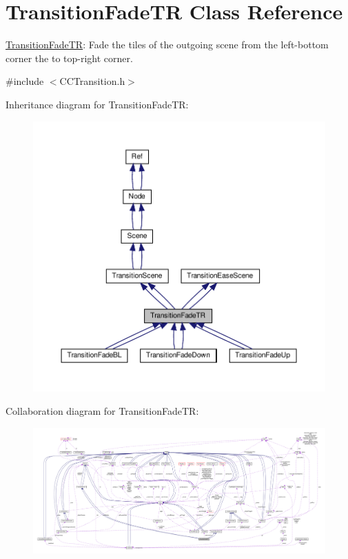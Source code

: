 \hypertarget{classTransitionFadeTR}{}\section{Transition\+Fade\+TR Class Reference}
\label{classTransitionFadeTR}


\hyperlink{classTransitionFadeTR}{Transition\+Fade\+TR}\+: Fade the tiles of the outgoing scene from the left-\/bottom corner the to top-\/right corner.  




{\ttfamily \#include $<$C\+C\+Transition.\+h$>$}



Inheritance diagram for Transition\+Fade\+TR\+:
\nopagebreak
\begin{figure}[H]
\begin{center}
\leavevmode
\includegraphics[width=350pt]{classTransitionFadeTR__inherit__graph}
\end{center}
\end{figure}


Collaboration diagram for Transition\+Fade\+TR\+:
\nopagebreak
\begin{figure}[H]
\begin{center}
\leavevmode
\includegraphics[width=350pt]{classTransitionFadeTR__coll__graph}
\end{center}
\end{figure}

